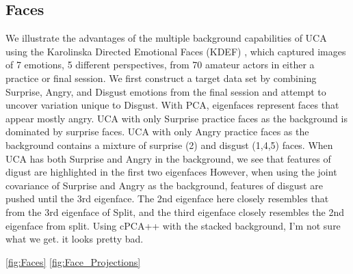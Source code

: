 \documentclass[12pt]{article}
\begin{document}


\subsection{Faces}
We illustrate the advantages of the multiple background capabilities of UCA using the Karolinska Directed Emotional Faces (KDEF) \cite{Calvo2008}, which captured images of 7 emotions, 5 different perspectives, from 70 amateur actors in either a practice or final session.
We first construct a target data set by combining Surprise, Angry, and Disgust emotions from the final session and attempt to uncover variation unique to Disgust. 
With PCA, eigenfaces represent faces that appear mostly angry.  
UCA with only Surprise practice faces as the background is dominated by surprise faces.
UCA with only Angry practice faces as the background contains a mixture of surprise (2) and disgust (1,4,5) faces.
When UCA has both Surprise and Angry in the background, we see that features of digust are highlighted in the first two eigenfaces
However, when using the joint covariance of Surprise and Angry as the background, features of disgust are pushed until the 3rd eigenface. The 2nd eigenface here closely resembles that from the 3rd eigenface of Split, and the third eigenface closely resembles the 2nd eigenface from split.
Using cPCA++ with the stacked background, I'm not sure what we get. it looks pretty bad.

\ref{fig:Faces}
\ref{fig:Face_Projections}
\end{document}
